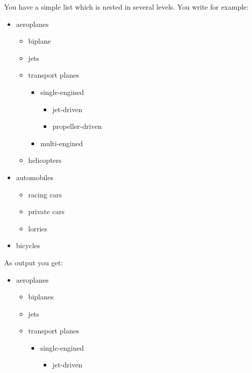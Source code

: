     \begin{Example}
      You have a simple list which is nested in several levels. You write
      for example:
\begin{lstcode}
  \begin{itemize}
    \item aeroplanes
    \begin{itemize}
      \item biplane
      \item jets
      \item transport planes
      \begin{itemize}
        \item single-engined
        \begin{itemize}
          \item jet-driven
          \item propeller-driven
        \end{itemize}
        \item multi-engined
      \end{itemize}
      \item helicopters
    \end{itemize}
    \item automobiles
    \begin{itemize}
      \item racing cars
      \item private cars
      \item lorries
    \end{itemize}
    \item bicycles
  \end{itemize}
\end{lstcode}
      As output you get:
      \begin{ShowOutput}[\baselineskip]
        \begin{itemize}
        \item aeroplanes
          \begin{itemize}
          \item biplanes
          \item jets
          \item transport planes
            \begin{itemize}
            \item single-engined
              \begin{itemize}
              \item jet-driven

\end{itemize}
\end{itemize}
\end{itemize}
\end{itemize}
\end{ShowOutput}
\end{Example}
